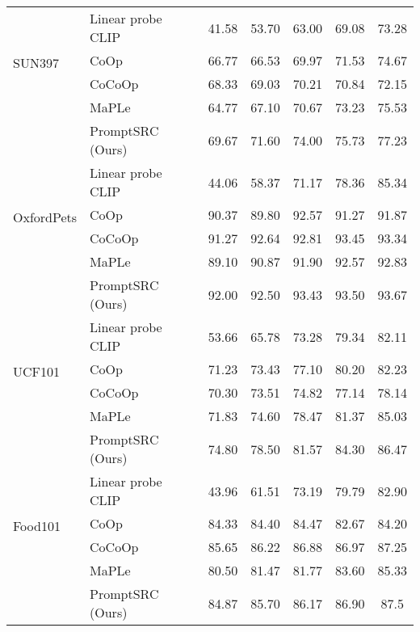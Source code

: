 \documentclass[10pt,twocolumn,letterpaper]{article}
\begin{document}
\begin{center}
\begin{table*}[t!]
{\begin{tabular}{ll|ccccc}
                               \midrule
\multirow{4}{*}{SUN397}        & Linear probe CLIP          & 41.58	&53.70	&63.00	&69.08	&73.28\\
                               & CoOp                     & 66.77	&66.53	&69.97	&71.53	&74.67\\
                               & CoCoOp                   & 68.33	&69.03&	70.21	&70.84	&72.15\\
                                                              & MaPLe                  & 64.77	&67.10	&70.67&	73.23&	75.53\\
                             \rowcolor{tabhighlight}   &  PromptSRC (Ours)               &69.67	&71.60	&74.00	&75.73	&77.23\\
                               \midrule
\multirow{4}{*}{OxfordPets}    & Linear probe CLIP        & 44.06	&58.37	&71.17	&78.36	&85.34\\
                               & CoOp                      & 90.37	&89.80	&92.57	&91.27	&91.87\\
                               & CoCoOp                       & 91.27	&92.64	&92.81	&93.45	&93.34\\
                                                              & MaPLe                  & 89.10	&90.87	&91.90&	92.57& 92.83\\
                              \rowcolor{tabhighlight} &   PromptSRC (Ours)                  & 92.00	&92.50	&93.43	&93.50	&93.67\\
                               \midrule
\multirow{4}{*}{UCF101}        & Linear probe CLIP        & 53.66	&65.78	&73.28	&79.34&	82.11\\
                               & CoOp                     & 71.23	&73.43	&77.10	&80.20	&82.23\\
                               & CoCoOp                   & 70.30	&73.51	&74.82	&77.14&	78.14\\
                                                              & MaPLe                  & 71.83	&74.60	& 78.47& 81.37&	85.03\\
                             \rowcolor{tabhighlight}  &   PromptSRC (Ours)                  & 74.80	&78.50	&81.57	&84.30	&86.47\\
\midrule
\multirow{4}{*}{Food101}       & Linear probe CLIP       & 43.96	&61.51	&73.19	&79.79	&82.90\\
                               & CoOp                    & 84.33	&84.40	&84.47	&82.67	&84.20\\
                               & CoCoOp                     & 85.65	&86.22	&86.88	&86.97	&87.25\\
                                                              & MaPLe                  & 80.50 &81.47	&81.77&	83.60&	85.33\\
                              \rowcolor{tabhighlight} &   PromptSRC (Ours)               & 84.87&	85.70	&86.17	&86.90	&87.5\\


\end{tabular}}
\end{table*}
\end{center}
\end{document}
